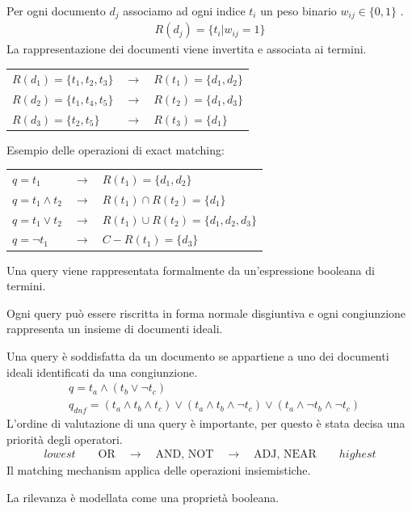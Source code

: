 Per ogni documento $d_j$ associamo ad ogni indice $t_i$ un peso binario $w_{ij} \in \{0, 1\}$ .
%
\begin{align*}
  R(d_j) = \{ t_i | w_{ij} = 1 \}
\end{align*}
%
La rappresentazione dei documenti viene invertita e associata ai termini.

\begin{table}[ht]
  \centering
  \begin{tabular}{lcl}
    $R(d_1) = \{t_1, t_2, t_3\}$ & $\rightarrow$ & $R(t_1) = \{d_1, d_2\}$ \\
    $R(d_2) = \{t_1, t_4, t_5\}$ & $\rightarrow$ & $R(t_2) = \{d_1, d_3\}$ \\
    $R(d_3) = \{t_2, t_5\}$      & $\rightarrow$ & $R(t_3) = \{d_1\}$
  \end{tabular}
\end{table}

Esempio delle operazioni di exact matching:

\begin{table}[ht]
  \centering
  \begin{tabular}{lcl}
    $q = t_1$           & $\rightarrow$ & $R(t_1) = \{d_1, d_2\}$                  \\
    $q = t_1 \land t_2$ & $\rightarrow$ & $R(t_1) \cap R(t_2) = \{d_1\}$           \\
    $q = t_1 \lor t_2$  & $\rightarrow$ & $R(t_1) \cup R(t_2) = \{d_1, d_2, d_3\}$ \\
    $q = \neg t_1$      & $\rightarrow$ & $C - R(t_1) = \{d_3\}$
  \end{tabular}
\end{table}

Una query viene rappresentata formalmente da un'espressione booleana di termini.

Ogni query può essere riscritta in forma normale disgiuntiva e ogni congiunzione rappresenta un
insieme di documenti ideali.

Una query è soddisfatta da un documento se appartiene a uno dei documenti ideali identificati da una congiunzione.
%
\begin{align*}
   & q = t_a \land (t_b \lor \neg t_c)                                                                                 \\
   & q_{dnf} = (t_a \land t_b \land t_c) \lor  (t_a \land t_b \land \neg t_c) \lor (t_a \land \neg t_b \land \neg t_c)
\end{align*}
%
L'ordine di valutazione di una query è importante, per questo è stata decisa una priorità degli operatori.
%
\begin{align*}
  lowest \qquad \text{OR} \quad \rightarrow \quad \text{AND, NOT} \quad \rightarrow \quad \text{ADJ, NEAR} \qquad highest
\end{align*}
%
Il matching mechanism applica delle operazioni insiemistiche.

La rilevanza è modellata come una proprietà booleana.
